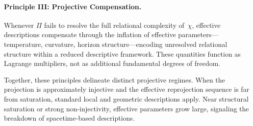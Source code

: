   \paragraph{Principle III: Projective Compensation.}
    Whenever $\Pi$ fails to resolve the full relational complexity of~$\chi$,
    effective descriptions compensate through the inflation of effective
    parameters---temperature, curvature, horizon structure---encoding
    unresolved relational structure within a reduced descriptive framework.
    These quantities function as Lagrange multipliers, not as additional
    fundamental degrees of freedom.

    Together, these principles delineate distinct projective regimes.
    When the projection is approximately injective and the effective
    reprojection sequence is far from saturation, standard local and geometric
    descriptions apply.
    Near structural saturation or strong non-injectivity, effective parameters
    grow large, signaling the breakdown of spacetime-based descriptions.

